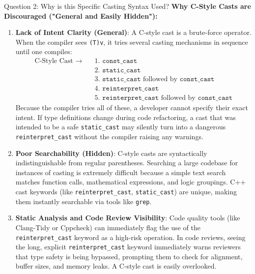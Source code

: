 \documentclass[11pt,a4paper]{article}
\begin{document}
\begin{explanationbox}{Question 2: Why is this Specific Casting Syntax Used?}
    \textbf{Why C-Style Casts are Discouraged ("General and Easily Hidden"):}
    \begin{enumerate}
        \item \textbf{Lack of Intent Clarity (General)}: A C-style cast is a brute-force operator. When the compiler sees \texttt{(T)v}, it tries several casting mechanisms in sequence until one compiles:
        \begin{align*}
            \text{C-Style Cast } \longrightarrow \quad &\text{1. } \texttt{const\_cast} \\
            &\text{2. } \texttt{static\_cast} \\
            &\text{3. } \texttt{static\_cast} \text{ followed by } \texttt{const\_cast} \\
            &\text{4. } \texttt{reinterpret\_cast} \\
            &\text{5. } \texttt{reinterpret\_cast} \text{ followed by } \texttt{const\_cast}
        \end{align*}
        Because the compiler tries all of these, a developer cannot specify their exact intent. If type definitions change during code refactoring, a cast that was intended to be a safe \texttt{static\_cast} may silently turn into a dangerous \texttt{reinterpret\_cast} without the compiler raising any warnings.
        \item \textbf{Poor Searchability (Hidden)}: C-style casts are syntactically indistinguishable from regular parentheses. Searching a large codebase for instances of casting is extremely difficult because a simple text search matches function calls, mathematical expressions, and logic groupings. C++ cast keywords (like \texttt{reinterpret\_cast}, \texttt{static\_cast}) are unique, making them instantly searchable via tools like \texttt{grep}.
        \item \textbf{Static Analysis and Code Review Visibility}: Code quality tools (like Clang-Tidy or Cppcheck) can immediately flag the use of the \texttt{reinterpret\_cast} keyword as a high-risk operation. In code reviews, seeing the long, explicit \texttt{reinterpret\_cast} keyword immediately warns reviewers that type safety is being bypassed, prompting them to check for alignment, buffer sizes, and memory leaks. A C-style cast is easily overlooked.
    \end{enumerate}
\end{explanationbox}
\end{document}
